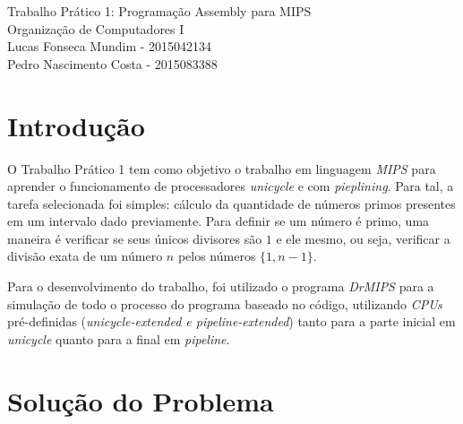 \begin{center}
 {\large Trabalho Prático 1: Programação Assembly para MIPS\\[1mm]}
 {\footnotesize Organização de Computadores I\\}
 {\footnotesize Lucas Fonseca Mundim - 2015042134\\}
 {\footnotesize Pedro Nascimento Costa - 2015083388\\ [2.0cm]}
\end{center}

\section{Introdução}
O Trabalho Prático 1 tem como objetivo o trabalho em linguagem {\it MIPS} para aprender o funcionamento de processadores {\it unicycle} e com {\it pieplining}. Para tal, a tarefa selecionada foi simples: cálculo da quantidade de números primos presentes em um intervalo dado previamente. Para definir se um número é primo, uma maneira é verificar se seus únicos divisores são $1$ e ele mesmo, ou seja, verificar a divisão exata de um número $n$ pelos números $\{1, n-1\}$.\par
Para o desenvolvimento do trabalho, foi utilizado o programa {\it DrMIPS} para a simulação de todo o processo do programa baseado no código, utilizando {\it CPUs} pré-definidas ({\it unicycle-extended e pipeline-extended}) tanto para a parte inicial em {\it unicycle} quanto para a final em {\it pipeline}.

\section{Solução do Problema}
